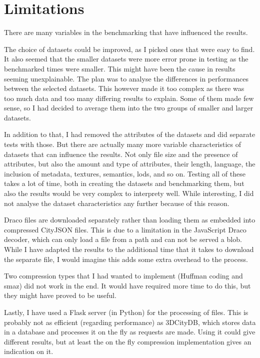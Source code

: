 


\section{Limitations}
\label{sec:limitations}

There are many variables in the benchmarking that have influenced the results.

The choice of datasets could be improved, as I picked ones that were easy to find.
It also seemed that the smaller datasets were more error prone in testing as the benchmarked times were smaller.
This might have been the cause in results seeming unexplainable.
The plan was to analyse the differences in performances between the selected datasets.
This however made it too complex as there was too much data and too many differing results to explain.
Some of them made few sense, so I had decided to average them into the two groups of smaller and larger datasets.

In addition to that, I had removed the attributes of the datasets and did separate tests with those.
But there are actually many more variable characteristics of datasets that can influence the results.
Not only file size and the presence of attributes, but also the amount and type of attributes, their length, language, the inclusion of metadata, textures, semantics, \ac{lod}s, and so on.
Testing all of these takes a lot of time, both in creating the datasets and benchmarking them, but also the results would be very complex to interprety well.
While interesting, I did not analyse the dataset characteristics any further because of this reason.

Draco files are downloaded separately rather than loading them as embedded into compressed CityJSON files.
This is due to a limitation in the JavaScript Draco decoder, which can only load a file from a path and can not be served a \ac{blob}.
While I have adapted the results to the additional time that it takes to download the separate file, I would imagine this adds some extra overhead to the process.

Two compression types that I had wanted to implement (Huffman coding and smaz) did not work in the end.
It would have required more time to do this, but they might have proved to be useful.

Lastly, I have used a Flask server (in Python) for the processing of files.
This is probably not as efficient (regarding performance) as 3DCityDB, which stores data in a database and processes it on the fly as requests are made.
Using it could give different results, but at least the on the fly compression implementation gives an indication on it.



